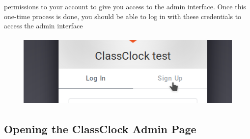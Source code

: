 \documentclass{article}
\begin{document}
\begin{enumerate}
{permissions to your account to give you access to the admin interface. Once this one-time process is done, you should
be able to log in with these credentials to access the admin interface}
\begin{figure}
\includegraphics[width=4.7701in,height=1.4366in]{Mini20Manual-img006.png}\end{figure}
\end{enumerate}
\subsection{Opening the ClassClock Admin Page}
\end{document}
